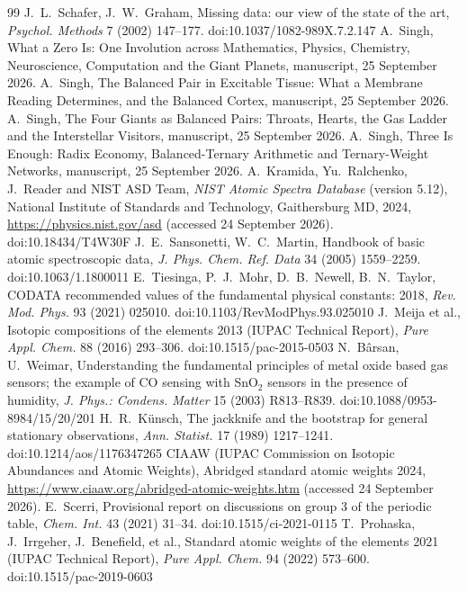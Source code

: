 \documentclass[11pt]{article}
\theoremstyle{definition}\newtheorem{definition}[theorem]{Definition}
\theoremstyle{remark}\newtheorem{remark}[theorem]{Remark}
\begin{document}
\begin{thebibliography}{99}
 J.~L.~Schafer, J.~W.~Graham, Missing data: our view of the state of the art, \emph{Psychol. Methods} 7 (2002) 147--177. doi:10.1037/1082-989X.7.2.147
 A.~Singh, What a Zero Is: One Involution across Mathematics, Physics, Chemistry, Neuroscience, Computation and the Giant Planets, manuscript, 25 September 2026.
 A.~Singh, The Balanced Pair in Excitable Tissue: What a Membrane Reading Determines, and the Balanced Cortex, manuscript, 25 September 2026.
 A.~Singh, The Four Giants as Balanced Pairs: Throats, Hearts, the Gas Ladder and the Interstellar Visitors, manuscript, 25 September 2026.
 A.~Singh, Three Is Enough: Radix Economy, Balanced-Ternary Arithmetic and Ternary-Weight Networks, manuscript, 25 September 2026.
 A.~Kramida, Yu.~Ralchenko, J.~Reader and NIST ASD Team, \emph{NIST Atomic Spectra Database} (version 5.12), National Institute of Standards and Technology, Gaithersburg MD, 2024, \url{https://physics.nist.gov/asd} (accessed 24 September 2026). doi:10.18434/T4W30F
 J.~E.~Sansonetti, W.~C.~Martin, Handbook of basic atomic spectroscopic data, \emph{J. Phys. Chem. Ref. Data} 34 (2005) 1559--2259. doi:10.1063/1.1800011
 E.~Tiesinga, P.~J.~Mohr, D.~B.~Newell, B.~N.~Taylor, CODATA recommended values of the fundamental physical constants: 2018, \emph{Rev. Mod. Phys.} 93 (2021) 025010. doi:10.1103/RevModPhys.93.025010
 J.~Meija et al., Isotopic compositions of the elements 2013 (IUPAC Technical Report), \emph{Pure Appl. Chem.} 88 (2016) 293--306. doi:10.1515/pac-2015-0503
 N.~B\^arsan, U.~Weimar, Understanding the fundamental principles of metal oxide based gas sensors; the example of CO sensing with SnO$_2$ sensors in the presence of humidity, \emph{J. Phys.: Condens. Matter} 15 (2003) R813--R839. doi:10.1088/0953-8984/15/20/201
 H.~R.~K\"unsch, The jackknife and the bootstrap for general stationary observations, \emph{Ann. Statist.} 17 (1989) 1217--1241. doi:10.1214/aos/1176347265
 CIAAW (IUPAC Commission on Isotopic Abundances and Atomic Weights), Abridged standard atomic weights 2024, \url{https://www.ciaaw.org/abridged-atomic-weights.htm} (accessed 24 September 2026).
 E.~Scerri, Provisional report on discussions on group 3 of the periodic table, \emph{Chem. Int.} 43 (2021) 31--34. doi:10.1515/ci-2021-0115
 T.~Prohaska, J.~Irrgeher, J.~Benefield, et al., Standard atomic weights of the elements 2021 (IUPAC Technical Report), \emph{Pure Appl. Chem.} 94 (2022) 573--600. doi:10.1515/pac-2019-0603

\end{thebibliography}
\end{document}
